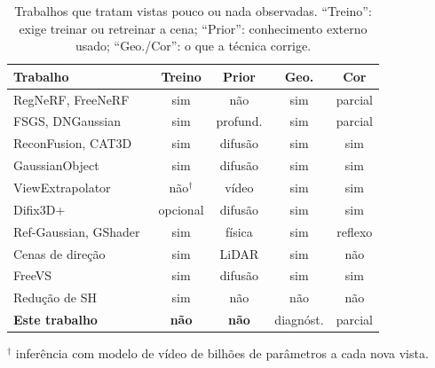 \begin{table}[t]
\centering
\caption{Trabalhos que tratam vistas pouco ou nada observadas. ``Treino'': exige treinar ou retreinar a cena; ``Prior'': conhecimento externo usado; ``Geo./Cor'': o que a técnica corrige.}
\label{tab:relacionados}
\setlength{\tabcolsep}{3pt}
\footnotesize
\begin{tabular}{l c c c c}
\toprule
Trabalho & Treino & Prior & Geo. & Cor \\
\midrule
RegNeRF, FreeNeRF~\cite{niemeyer2022regnerf,yang2023freenerf} & sim & não & sim & parcial \\
FSGS, DNGaussian~\cite{zhu2024fsgs,li2024dngaussian} & sim & profund. & sim & parcial \\
ReconFusion, CAT3D~\cite{wu2024reconfusion,gao2024cat3d} & sim & difusão & sim & sim \\
GaussianObject~\cite{yang2024gaussianobject} & sim & difusão & sim & sim \\
ViewExtrapolator~\cite{liu2024viewextrapolator} & não$^\dagger$ & vídeo & sim & sim \\
Difix3D+~\cite{wu2025difix3d} & opcional & difusão & sim & sim \\
Ref-Gaussian, GShader~\cite{yao2025refgaussian,jiang2024gshader} & sim & física & sim & reflexo \\
Cenas de direção~\cite{yan2024streetgs,zhou2024drivinggaussian,chen2025omnire} & sim & LiDAR & sim & não \\
FreeVS~\cite{wang2025freevs} & sim & difusão & sim & sim \\
Redução de SH~\cite{fan2024lightgaussian,papantonakis2024reducing} & sim & não & não & não \\
\midrule
\textbf{Este trabalho} & \textbf{não} & \textbf{não} & diagnóst. & parcial \\
\bottomrule
\end{tabular}

\vspace{2pt}
{\scriptsize $^\dagger$ inferência com modelo de vídeo de bilhões de parâmetros a cada nova vista.}
\end{table}
